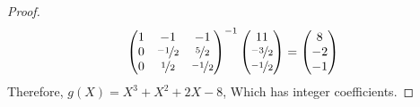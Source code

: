 \documentclass[11pt]{article}
\theoremstyle{definition}
\begin{document}
\begin{proof}
        \[
             \begin{pmatrix}
                1 & -1 & -1 \\
                0 & \nicefrac{-1}{2} & \nicefrac{5}{2} \\
                0 &  \nicefrac{1}{2} & \nicefrac{-1}{2}
            \end{pmatrix}^{-1}
            \begin{pmatrix}
                11 \\
                \nicefrac{-3}{2} \\
                \nicefrac{-1}{2}
            \end{pmatrix}
             =
            \begin{pmatrix}
                8 \\
                -2 \\
                -1
            \end{pmatrix}
        \]
        Therefore, $g(X) = X^3 +X^2 +2X -8$, Which has integer coefficients.


    \end{proof}
    
\end{document}
